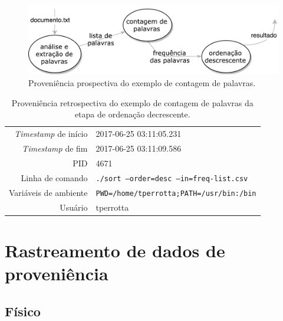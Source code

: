 \begin{figure}[ht]
    \centering
    \includegraphics[width=\textwidth]{img/word-count-prospective}
    \caption[Proveniência prospectiva do exemplo de contagem de palavras]{Proveniência prospectiva do exemplo de contagem de palavras.}%
    \label{fig:word-count-prospective}
\end{figure}

\begin{table}[ht]
    \centering
    \begin{tabular}{r|l}
        \hline
        \textit{Timestamp} de início & 2017-06-25 03:11:05.231                         \\
        \textit{Timestamp} de fim    & 2017-06-25 03:11:09.586                         \\
        PID                          & 4671                                            \\
        Linha de comando             & \texttt{./sort --order=desc --in=freq-list.csv} \\
        Variáveis de ambiente        & \texttt{PWD=/home/tperrotta;PATH=/usr/bin:/bin} \\
        Usuário                      & tperrotta                                       \\
        \hline
    \end{tabular}
    \caption[Proveniência retrospectiva do exemplo de contagem de palavras]{Proveniência retrospectiva do exemplo de contagem de palavras da etapa de ordenação decrescente.}%
    \label{tab:word-count-retrospective}
\end{table}

\section{Rastreamento de dados de proveniência}

\subsection{Físico}

